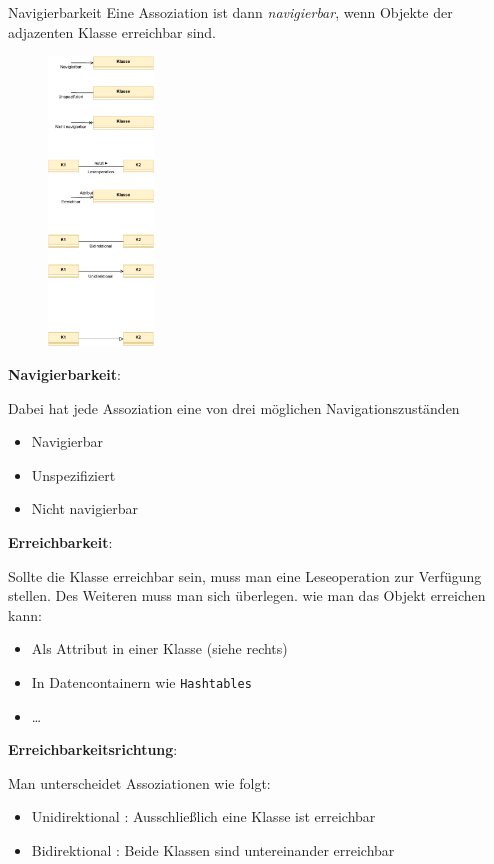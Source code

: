 \begin{defi}{Navigierbarkeit}
    Eine Assoziation ist dann \emph{navigierbar}, wenn Objekte der adjazenten Klasse erreichbar sind.

    \begin{figure}
        \centering
        \includegraphics[width=0.25\textwidth]{includes/figures/defi_diagrams_class_assoziation.pdf}
    \end{figure}
    \textbf{Navigierbarkeit}:

    Dabei hat jede Assoziation eine von drei möglichen Navigationszuständen
    \begin{itemize}
        \item Navigierbar
        \item Unspezifiziert
        \item Nicht navigierbar
    \end{itemize}

    \textbf{Erreichbarkeit}:

    Sollte die Klasse erreichbar sein, muss man eine Leseoperation zur Verfügung stellen.
    Des Weiteren muss man sich überlegen. wie man das Objekt erreichen kann:
    \begin{itemize}
        \item Als Attribut in einer Klasse (siehe rechts)
        \item In Datencontainern wie \texttt{Hashtables}
        \item \ldots
    \end{itemize}

    \textbf{Erreichbarkeitsrichtung}:

    Man unterscheidet Assoziationen wie folgt:
    \begin{itemize}
        \item Unidirektional : Ausschließlich eine Klasse ist erreichbar
        \item Bidirektional : Beide Klassen sind untereinander erreichbar
    \end{itemize}
\end{defi}

